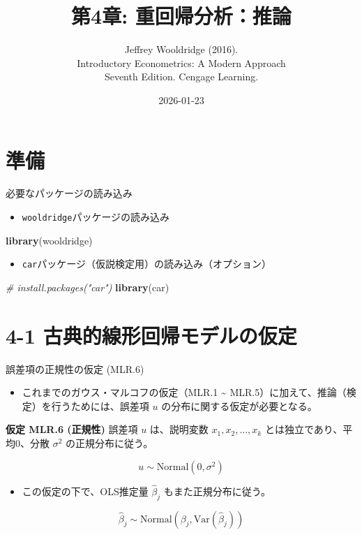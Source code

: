 \documentclass[
  ignorenonframetext,
]{beamer}
\title{第4章: 重回帰分析：推論}
\subtitle{Jeffrey Wooldridge (2016).\\
Introductory Econometrics: A Modern Approach\\
Seventh Edition. Cengage Learning.}
\author{}
\date{\vspace{-2.5em}2026-01-23}
\newenvironment{Shaded}{\begin{snugshade}}{\end{snugshade}}
\newcommand{\CommentTok}[1]{\textcolor[rgb]{0.56,0.35,0.01}{\textit{#1}}}
\newcommand{\FunctionTok}[1]{\textcolor[rgb]{0.13,0.29,0.53}{\textbf{#1}}}
\newcommand{\NormalTok}[1]{#1}
\providecommand{\tightlist}{%
  \setlength{\itemsep}{0pt}\setlength{\parskip}{0pt}}
\begin{document}
\frame{\titlepage}

\section{準備}\label{ux6e96ux5099}

\begin{frame}[fragile]{必要なパッケージの読み込み}
\label{ux5fc5ux8981ux306aux30d1ux30c3ux30b1ux30fcux30b8ux306eux8aadux307fux8fbcux307f}
\begin{itemize}
\tightlist
\item
  \texttt{wooldridge}パッケージの読み込み
\end{itemize}

\begin{Shaded}
\begin{Highlighting}[]
\FunctionTok{library}\NormalTok{(wooldridge)}
\end{Highlighting}
\end{Shaded}

\begin{itemize}
\tightlist
\item
  \texttt{car}パッケージ（仮説検定用）の読み込み（オプション）
\end{itemize}

\begin{Shaded}
\begin{Highlighting}[]
\CommentTok{\# install.packages("car")}
\FunctionTok{library}\NormalTok{(car)}
\end{Highlighting}
\end{Shaded}
\end{frame}

\section{4-1
古典的線形回帰モデルの仮定}\label{ux53e4ux5178ux7684ux7ddaux5f62ux56deux5e30ux30e2ux30c7ux30ebux306eux4eeeux5b9a}

\begin{frame}{誤差項の正規性の仮定 (MLR.6)}
\label{ux8aa4ux5deeux9805ux306eux6b63ux898fux6027ux306eux4eeeux5b9a-mlr.6}
\begin{itemize}
\tightlist
\item
  これまでのガウス・マルコフの仮定（MLR.1 \textasciitilde{}
  MLR.5）に加えて、推論（検定）を行うためには、誤差項 \(u\)
  の分布に関する仮定が必要となる。
\end{itemize}

\textbf{仮定 MLR.6 (正規性)} 誤差項 \(u\) は、説明変数
\(x_1, x_2, \dots, x_k\) とは独立であり、平均0、分散 \(\sigma^2\)
の正規分布に従う。

\[ u \sim \text{Normal}(0, \sigma^2) \]

\begin{itemize}
\tightlist
\item
  この仮定の下で、OLS推定量 \(\hat{\beta}_j\) もまた正規分布に従う。
\end{itemize}

\[ \hat{\beta}_j \sim \text{Normal}(\beta_j, \text{Var}(\hat{\beta}_j)) \]
\end{frame}
\end{document}
